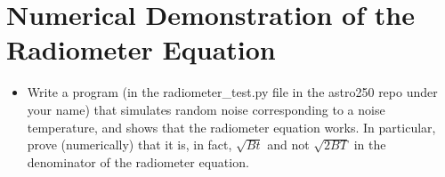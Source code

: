 \documentclass[11pt]{article}
\begin{document}
\section{Numerical Demonstration of the Radiometer Equation}
\begin{itemize}
\item Write a program (in the radiometer\_test.py file in the astro250 repo under your name) that simulates 
random noise corresponding to a noise temperature, and shows that the radiometer equation works.  In particular,
prove (numerically) that it is, in fact, $\sqrt{Bt}$ and not $\sqrt{2BT}$ in the denominator of the
radiometer equation.
\end{itemize}
\end{document}
